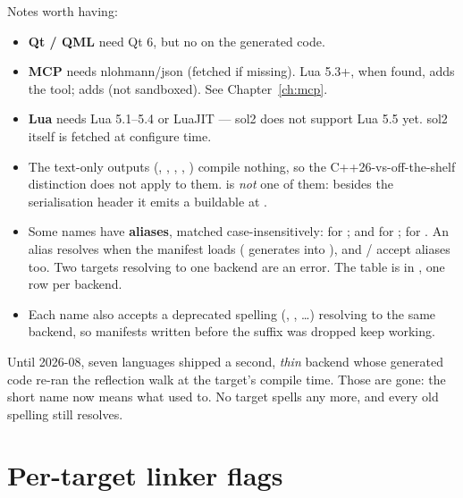 Notes worth having:

\begin{itemize}
  \item \textbf{Qt / QML} need Qt 6, but no  on the generated code.
  \item \textbf{MCP} needs nlohmann/json (fetched if missing). Lua 5.3+, when
    found, adds the  tool; 
    adds  (not sandboxed). See Chapter~\ref{ch:mcp}.
  \item \textbf{Lua} needs Lua 5.1--5.4 or LuaJIT --- sol2 does not support Lua
    5.5 yet. sol2 itself is fetched at configure time.
  \item The text-only outputs (, , ,
    , ) compile nothing, so the
    C++26-vs-off-the-shelf distinction does not apply to them.  is
    \emph{not} one of them: besides the serialisation header it emits a
    buildable  at .
  \item Some names have \textbf{aliases}, matched case-insensitively:
     for ;  and  for
    ;  for . An alias resolves when the
    manifest loads ( generates into ), and
     /  accept aliases too. Two targets resolving to
    one backend are an error. The table is  in
    , one row per backend.
  \item Each name also accepts a deprecated  spelling
    (, , \ldots) resolving to the same
    backend, so manifests written before the suffix was dropped keep working.
\end{itemize}

\begin{note}
Until 2026-08, seven languages shipped a second, \emph{thin} backend whose
generated code re-ran the reflection walk at the target's compile time. Those
are gone: the short name now means what  used to. No target
spells  any more, and every old spelling still resolves.
\end{note}

\section{Per-target linker flags}

